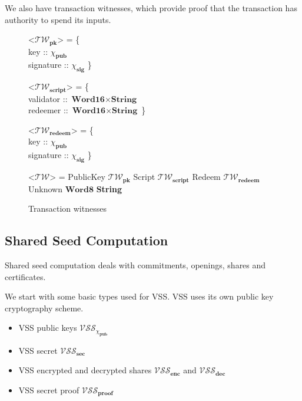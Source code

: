 \documentclass{article}
\def\fld{\\\llap{,\quad}}%
\newcommand{\pubkey}{\chi_{\textbf{pub}}}
\newcommand{\signature}{\chi_{\textbf{sig}}}
\newcommand{\vsspubkey}{\mathcal{VSS}_{\chi_{\textbf{pub}}}}
\newcommand{\vssproof}{\mathcal{VSS}_{\textbf{proof}}}
\newcommand{\vsssec}{\mathcal{VSS}_{\textbf{sec}}}
\newcommand{\vssencshare}{\mathcal{VSS}_{\textbf{enc}}}
\newcommand{\vssdecshare}{\mathcal{VSS}_{\textbf{dec}}}
\newcommand{\twit}{\mathcal{TW}}
\newcommand{\twitpk}{\twit_{\textbf{pk}}}
\newcommand{\twitscript}{\twit_{\textbf{script}}}
\newcommand{\twitredeem}{\twit_{\textbf{redeem}}}
\newcommand{\hstype}[1]{\textbf{#1}}
\newcommand{\String}{\hstype{String}}
\newcommand{\Word}[1]{\hstype{Word#1}}
\begin{document}
We also have transaction witnesses, which provide proof that the transaction has
authority to spend its inputs.

\begin{figure}[H]
  \caption{Transaction witnesses}
  \begin{grammar}
    <$\twitpk$> = \{
    \fld key :: $\pubkey$
    \fld signature :: $\signature$
    \}

    <$\twitscript$> = \{
    \fld validator :: $\Word{16}\times\String$
    \fld redeemer :: $\Word{16}\times\String$
    \}

    <$\twitredeem$> = \{
    \fld key :: $\pubkey$
    \fld signature :: $\signature$
    \}

    <$\twit$> = PublicKey $\twitpk$
    \alt Script $\twitscript$
    \alt Redeem $\twitredeem$
    \alt Unknown $\Word{8}$ \String
  \end{grammar}
\end{figure}

\subsection{Shared Seed Computation}

Shared seed computation deals with commitments, openings, shares and
certificates.

We start with some basic types used for VSS. VSS uses its own public key
cryptography scheme.

\begin{itemize}
\item VSS public keys $\vsspubkey$
\item VSS secret $\vsssec$
\item VSS encrypted and decrypted shares $\vssencshare$ and $\vssdecshare$
\item VSS secret proof $\vssproof$
\end{itemize}
\end{document}

